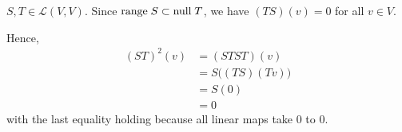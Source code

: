 \documentclass[a5paper]{article}
\begin{document}
\newcommand    \C  { \mathbf{C} }
\newcommand    \R  { \mathbf{R} }
\renewcommand  \L  { \mathcal{L} }
\newcommand    \F  { \mathbf{F} }

$S, T \in \L(V,V)$. Since $\text{range\;}S \subset \text{null\;}T$, we have $(TS)(v) = 0$ for all $v \in V$.

Hence,
\begin{align*}
    (ST)^2(v) &= (STST)(v)                      \\
              &= S \big( (TS)(Tv) \big)         \\
              &= S (0)                          \\
              &= 0
\end{align*}
with the last equality holding because all linear maps take 0 to 0.
\end{document}
